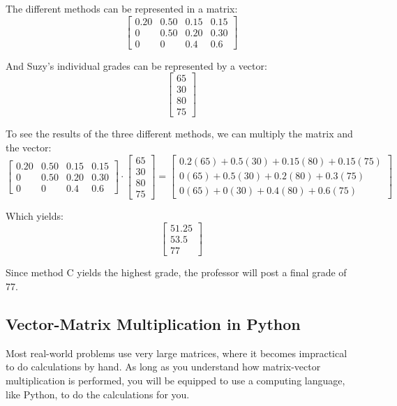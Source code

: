 \begin{Answer}[ref = vmm02]
The different methods can be represented in a matrix:
$$\begin{bmatrix}
0.20 & 0.50 & 0.15 & 0.15\\
0 & 0.50 & 0.20 & 0.30\\
0 & 0 & 0.4 & 0.6
\end{bmatrix}$$

And Suzy's individual grades can be represented by a vector:
$$\begin{bmatrix}
65\\
30\\
80\\
75
\end{bmatrix}
$$

To see the results of the three different methods, we can multiply the matrix and the vector:
$$\begin{bmatrix}
0.20 & 0.50 & 0.15 & 0.15\\
0 & 0.50 & 0.20 & 0.30\\
0 & 0 & 0.4 & 0.6
\end{bmatrix}
\cdot 
\begin{bmatrix}
65\\
30\\
80\\
75
\end{bmatrix} = 
\begin{bmatrix}
0.2(65)+0.5(30)+0.15(80) + 0.15(75)\\
0(65) + 0.5(30) + 0.2(80) + 0.3(75)\\
0(65) + 0(30) + 0.4(80) + 0.6(75)
\end{bmatrix}$$

Which yields:
$$\begin{bmatrix}
51.25\\
53.5\\
77
\end{bmatrix}$$

Since method C yields the highest grade, the professor will post a final grade of 77. 
\end{Answer}

\subsection{Vector-Matrix Multiplication in Python}
Most real-world problems use very large matrices, where it becomes impractical to do calculations by hand. As long as you understand how matrix-vector multiplication is performed, you will be equipped to use a computing language, like Python, to do the calculations for you. 

